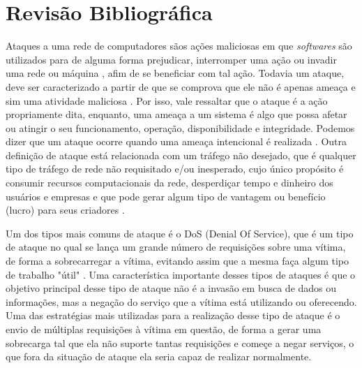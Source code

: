\chapter[Revisão Bibliográfica]{Revisão Bibliográfica}
\label{fundamentacao}

Ataques a uma rede de computadores sãos ações maliciosas em que \textit{softwares} são utilizados para de alguma forma prejudicar, interromper uma ação ou invadir uma rede ou máquina , afim de se beneficiar com tal ação. Todavia um ataque, deve ser caracterizado a partir de que se comprova que ele não é apenas ameaça e sim uma atividade maliciosa . Por isso, vale ressaltar que o ataque é a ação propriamente dita, enquanto, uma ameaça a um sistema é algo que possa afetar ou atingir o seu funcionamento, operação, disponibilidade e integridade. Podemos dizer que um ataque ocorre quando uma ameaça intencional é realizada \cite{dos2017ameaccas}.  Outra definição de ataque está relacionada com um tráfego não desejado, que é qualquer tipo de tráfego de rede não requisitado e/ou inesperado, cujo único propósito é consumir recursos computacionais da rede, desperdiçar tempo e dinheiro dos usuários e empresas e que pode gerar algum tipo de vantagem ou benefício (lucro) para seus criadores \cite{feitosa2008trafego}. 

Um dos tipos mais comuns de ataque é o DoS (Denial Of Service), que  é um tipo de ataque no qual se lança um grande número de requisições sobre uma vítima, de forma a sobrecarregar a vítima, evitando assim que a mesma faça algum tipo de trabalho "útil" \cite{handley2006internet}. Uma característica importante desses tipos de ataques é que o objetivo principal desse tipo de ataque não é a invasão em busca de dados ou informações, mas a negação do serviço que a vítima está utilizando ou oferecendo.  Uma das estratégias mais utilizadas para a realização desse tipo de ataque é o envio de múltiplas requisições à vítima em questão, de forma a gerar uma sobrecarga tal que ela não suporte tantas requisições e começe a negar serviços, o que fora da situação de ataque ela seria capaz de realizar normalmente\cite{mandia2001hackers}.

